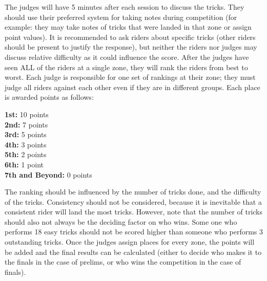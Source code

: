 The judges will have 5 minutes after each session to discuss the tricks.
They should use their preferred system for taking notes during competition (for example: they may take notes of tricks that were landed in that zone or assign point values).
It is recommended to ask riders about specific tricks (other riders should be present to justify the response), but neither the riders nor judges may discuss relative difficulty as it could influence the score.
After the judges have seen ALL of the riders at a single zone, they will rank the riders from best to worst.
Each judge is responsible for one set of rankings at their zone; they must judge all riders against each other even if they are in different groups.
Each place is awarded points as follows:

\textbf{1st:} 10 points\\
\textbf{2nd:} 7 points\\
\textbf{3rd:} 5 points\\
\textbf{4th:} 3 points\\
\textbf{5th:} 2 points\\
\textbf{6th:} 1 point\\ 
\textbf{7th and Beyond:} 0 points

The ranking should be influenced by the number of tricks done, and the difficulty of the tricks.
Consistency should not be considered, because it is inevitable that a consistent rider will land the most tricks.
However, note that the number of tricks
should also not always be the deciding factor on who wins.
Some one who performs 18 easy tricks should not be scored higher than someone who performs 3 outstanding tricks.
Once the judges assign places for every zone, the points will be added and the final results can be calculated (either to decide who makes it to the finals in the case of prelims, or who wins the competition in the case of finals).